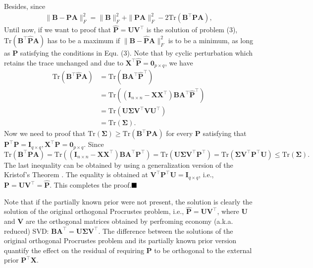 \documentclass[titlepage,11pt,twoside]{article}
\begin{document}
Besides, since
\begin{equation}
\begin{split}
\|\mathbf{B}-\mathbf{P}\mathbf{A}\|_{F}^{2}
=\|\mathbf{B}\|_{F}^{2}+\|\mathbf{P}\mathbf{A}\|_{F}^{2}-2\text{Tr}(\mathbf{B}^{\top}\mathbf{P}\mathbf{A}),
\end{split}
\end{equation}
Until now, if we want to proof that $\mathbf{\hat{P}}=\mathbf{U}\mathbf{V}^{\top}$ is the solution of problem (3), $\text{Tr}(\mathbf{B}^{\top}\mathbf{\hat{P}}\mathbf{A})$ has to be a maximum if $\|\mathbf{B}-\mathbf{\hat{P}}\mathbf{A}\|_{F}^{2}$ is to be a minimum, as long as $\mathbf{P}$ satisfying the conditions in Equ. (3).
Note that by cyclic perturbation which retains the trace unchanged and due to $\mathbf{X}^{\top}\mathbf{\hat{P}}=\mathbf{0}_{p\times q}$, we have 
\begin{equation}
\begin{split}
\text{Tr}(\mathbf{B}^{\top}\mathbf{\hat{P}}\mathbf{A})
&
=
\text{Tr}(\mathbf{B}\mathbf{A}^{\top}\mathbf{\hat{P}}^{\top})
\\
&
=
\text{Tr}((\mathbf{I}_{n\times n}-\mathbf{X}\mathbf{X}^{\top})\mathbf{B}\mathbf{A}^{\top}\mathbf{\hat{P}}^{\top})
\\
&
=
\text{Tr}(\mathbf{U}\mathbf{\Sigma}\mathbf{V}^{\top}\mathbf{V}\mathbf{U}^{\top})
\\
&
=
\text{Tr}(\mathbf{\Sigma}).
\end{split}
\end{equation}
Now we need to proof that $\text{Tr}(\mathbf{\Sigma})\ge\text{Tr}(\mathbf{B}^{\top}\mathbf{P}\mathbf{A})$ for every $\mathbf{P}$ satisfying that $\mathbf{P}^{\top}\mathbf{P} = \mathbf{I}_{q\times q}, \mathbf{X}^{\top}\mathbf{P} = \mathbf{0}_{p\times q}$. 
Since $\text{Tr}(\mathbf{B}^{\top}\mathbf{P}\mathbf{A})
=
\text{Tr}((\mathbf{I}_{n\times n}-\mathbf{X}\mathbf{X}^{\top})\mathbf{B}\mathbf{A}^{\top}\mathbf{P}^{\top})
=
\text{Tr}(\mathbf{U}\mathbf{\Sigma}\mathbf{V}^{\top}\mathbf{P}^{\top})
=
\text{Tr}(\mathbf{\Sigma}\mathbf{V}^{\top}\mathbf{P}^{\top}\mathbf{U})
\le
\text{Tr}(\mathbf{\Sigma})
.
$
The last inequality can be obtained by using a generalization version \cite{TenBerge1983} of the Kristof's Theorem \cite{Kristof1970515}. The equality is obtained at 
$\mathbf{V}^{\top}\mathbf{P}^{\top}\mathbf{U}=\mathbf{I}_{q\times q}$, i.e., $\mathbf{P}=\mathbf{U}\mathbf{V}^{\top}=\mathbf{\hat{P}}$. This completes the proof.$\hfill\blacksquare$ 

Note that if the partially known prior were not present, the solution is clearly the solution of the original orthogonal Procrustes problem, i.e., $\mathbf{\hat{P}} = \mathbf{U}\mathbf{V}^{\top}$, where $\mathbf{U}$ and $\mathbf{V}$ are the orthogonal matrices obtained by perfroming economy (a.k.a. reduced) SVD:
$\mathbf{B}\mathbf{A}^{\top} = \mathbf{U}\mathbf{\mathbf{\Sigma}}\mathbf{V}^{\top}$. 
The difference between the solutions of the original orthogonal Procrustes problem and its partially known prior version quantify the effect on the residual of requiring $\mathbf{P}$ to be orthogonal to the external prior $\mathbf{P}^{\top}\mathbf{X}$.
\end{document}
